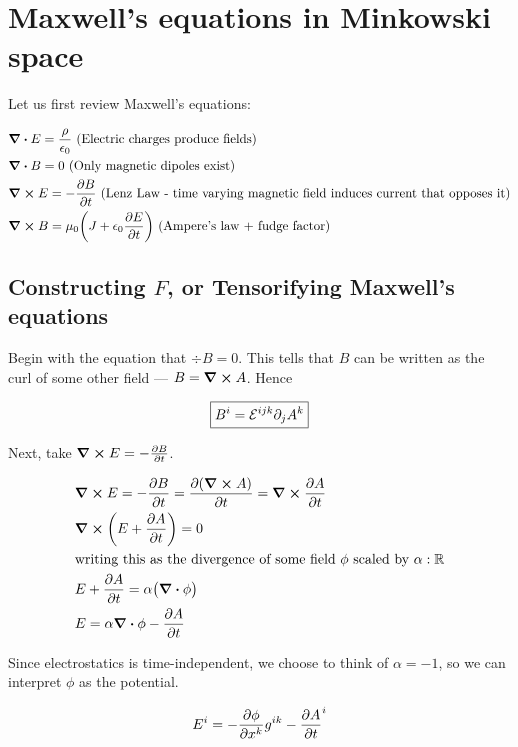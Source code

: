 \chapter{Maxwell's equations in Minkowski space}

Let us first review Maxwell's equations:

\begin{align*}
&\div E = \frac{\rho}{\epsilon_0}~\text{(Electric charges produce fields)}\\
&\div B = 0~\text{(Only magnetic dipoles exist)}\\
&\curl E = - \pdv{B}{t}~\text{(Lenz Law - time varying magnetic field induces current that opposes it)} \\
&\curl B =  \mu_0 \bigg(J + \epsilon_0 \pdv{E}{t} \bigg)~\text{(Ampere's law + fudge factor)}
\end{align*}

\section{Constructing $F$, or Tensorifying Maxwell's equations}

Begin with the equation that $\div B = 0$. This tells that $B$ can be written
as the curl of some other field --- $B = \curl A$. Hence

\begin{equation}
    \boxed{ B^i = \mathcal{E}^{ijk}  \partial_j A^k }
\end{equation}

Next, take $\curl E = - \pdv{B}{t}$.


\begin{align*}
&\curl E = - \pdv{B}{t} = \pdv{(\curl A)}{t} = \curl{\pdv{A}{t}} \\
&\curl (E + \pdv{A}{t}) = 0 \\
&\text{writing this as the divergence of some field $\phi$ scaled by $\alpha : \mathbb{R}$} \\
&E + \pdv{A}{t} = \alpha \big(\div \phi\big) \\
&E = \alpha \div \phi - \pdv{A}{t}
\end{align*}

Since electrostatics is time-independent, we choose to think of $\alpha = -1$, 
so we can interpret $\phi$ as the potential.

\begin{equation}
     E^i = - \pdv{\phi}{x^k}  g^{ik} - \pdv{A}{t}^i
\end{equation}

